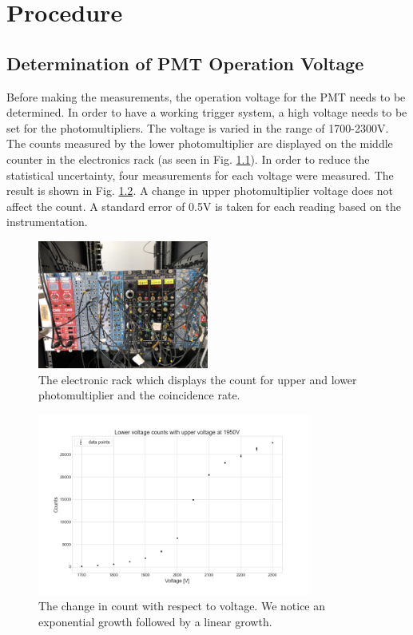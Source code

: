 \documentclass[a4paper]{report}
\numberwithin{equation}{section}
\begin{document}
\chapter{Procedure} \label{chap:procedure}

\section{Determination of PMT Operation Voltage}
Before making the measurements, the operation voltage for the PMT needs to be determined. In order to have a working trigger system, a high voltage needs to be set for the photomultipliers. The voltage is varied in the range of 1700-2300V. The counts measured by the lower photomultiplier are displayed on the middle counter in the electronics rack (as seen in Fig. \ref{fig:rack}). In order to reduce the statistical uncertainty, four measurements for each voltage were measured. The result is shown in Fig. \ref{fig:low_count}. A change in upper photomultiplier voltage does not affect the count. A standard error of 0.5V is taken for each reading based on the instrumentation. 

\begin{figure}[htpb]
    \centering
    \includegraphics[width=0.5\textwidth]{rack.jpg}
    \caption{The electronic rack which displays the count for upper and lower photomultiplier and the coincidence rate.}
    \label{fig:rack}
\end{figure}	

\begin{figure}[htpb]
    \centering
    \includegraphics[width=0.8\textwidth]{low_count}
    \caption{The change in count with respect to voltage. We notice an exponential growth followed by a linear growth.}
    \label{fig:low_count}
\end{figure}	
\end{document}
